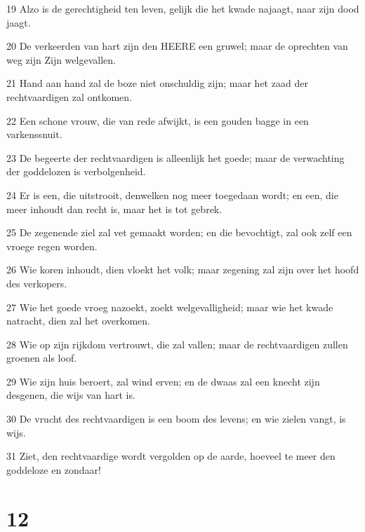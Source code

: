 \par 19 Alzo is de gerechtigheid ten leven, gelijk die het kwade najaagt, naar zijn dood jaagt.
\par 20 De verkeerden van hart zijn den HEERE een gruwel; maar de oprechten van weg zijn Zijn welgevallen.
\par 21 Hand aan hand zal de boze niet onschuldig zijn; maar het zaad der rechtvaardigen zal ontkomen.
\par 22 Een schone vrouw, die van rede afwijkt, is een gouden bagge in een varkenssnuit.
\par 23 De begeerte der rechtvaardigen is alleenlijk het goede; maar de verwachting der goddelozen is verbolgenheid.
\par 24 Er is een, die uitstrooit, denwelken nog meer toegedaan wordt; en een, die meer inhoudt dan recht is, maar het is tot gebrek.
\par 25 De zegenende ziel zal vet gemaakt worden; en die bevochtigt, zal ook zelf een vroege regen worden.
\par 26 Wie koren inhoudt, dien vloekt het volk; maar zegening zal zijn over het hoofd des verkopers.
\par 27 Wie het goede vroeg nazoekt, zoekt welgevalligheid; maar wie het kwade natracht, dien zal het overkomen.
\par 28 Wie op zijn rijkdom vertrouwt, die zal vallen; maar de rechtvaardigen zullen groenen als loof.
\par 29 Wie zijn huis beroert, zal wind erven; en de dwaas zal een knecht zijn desgenen, die wijs van hart is.
\par 30 De vrucht des rechtvaardigen is een boom des levens; en wie zielen vangt, is wijs.
\par 31 Ziet, den rechtvaardige wordt vergolden op de aarde, hoeveel te meer den goddeloze en zondaar!

\chapter{12}


